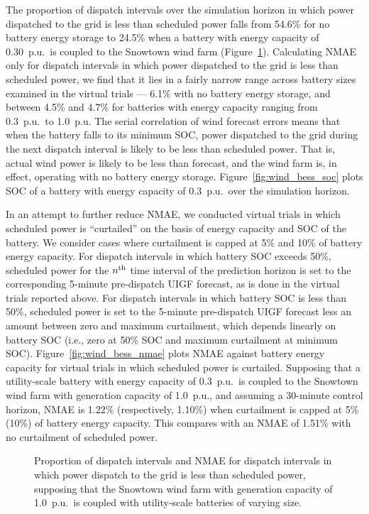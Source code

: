 \documentclass[a4paper, 10pt, twocolumn, preprint, 3p]{elsarticle}
\begin{document}
The proportion of dispatch intervals over the simulation horizon in which power dispatched to the grid is less than scheduled power falls from 54.6\% for no battery energy storage to 24.5\% when a battery with energy capacity of 0.30~p.u.\ is coupled to the Snowtown wind farm (Figure~\ref{fig:wind_bess_nmae_deficit}).  Calculating NMAE only for dispatch intervals in which power dispatched to the grid is less than scheduled power, we find that it lies in a fairly narrow range across battery sizes examined in the virtual trials --- 6.1\% with no battery energy storage, and between 4.5\% and 4.7\% for batteries with energy capacity ranging from 0.3~p.u.\ to 1.0~p.u.  The serial correlation of wind forecast errors means that when the battery falls to its minimum SOC, power dispatched to the grid during the next dispatch interval is likely to be less than scheduled power.  That is, actual wind power is likely to be less than forecast, and the wind farm is, in effect, operating with no battery energy storage.  Figure~\ref{fig:wind_bess_soc} plots SOC of a battery with energy capacity of 0.3~p.u.\ over the simulation horizon.

In an attempt to further reduce NMAE, we conducted virtual trials in which scheduled power is ``curtailed'' on the basis of energy capacity and SOC of the battery.  We consider cases where curtailment is capped at 5\% and 10\% of battery energy capacity.  For dispatch intervals in which battery SOC exceeds 50\%, scheduled power for the $n\textsuperscript{th}$ time interval of the prediction horizon is set to the corresponding 5-minute pre-dispatch UIGF forecast, as is done in the virtual trials reported above.  For dispatch intervals in which battery SOC is less than 50\%, scheduled power is set to the 5-minute pre-dispatch UIGF forecast less an amount between zero and maximum curtailment, which depends linearly on battery SOC (i.e., zero at 50\% SOC and maximum curtailment at minimum SOC).  Figure~\ref{fig:wind_bess_nmae} plots NMAE against battery energy capacity for virtual trials in which scheduled power is curtailed.  Supposing that a utility-scale battery with energy capacity of 0.3~p.u.\ is coupled to the Snowtown wind farm with generation capacity of 1.0~p.u., and assuming a 30-minute control horizon, NMAE is 1.22\% (respectively, 1.10\%) when curtailment is capped at 5\% (10\%) of battery energy capacity.  This compares with an NMAE of 1.51\% with no curtailment of scheduled power.

\begin{figure}[!t]
	\centering
	\scalebox{0.55}{
		
	}
	\caption[Proportion of dispatch intervals in which power dispatched to the grid is less than scheduled power]{Proportion of dispatch intervals and NMAE for dispatch intervals in which power dispatch to the grid is less than scheduled power, supposing that the Snowtown wind farm with generation capacity of 1.0~p.u.\ is coupled with utility-scale batteries of varying size.} 
	\label{fig:wind_bess_nmae_deficit}
\end{figure}
\end{document}
